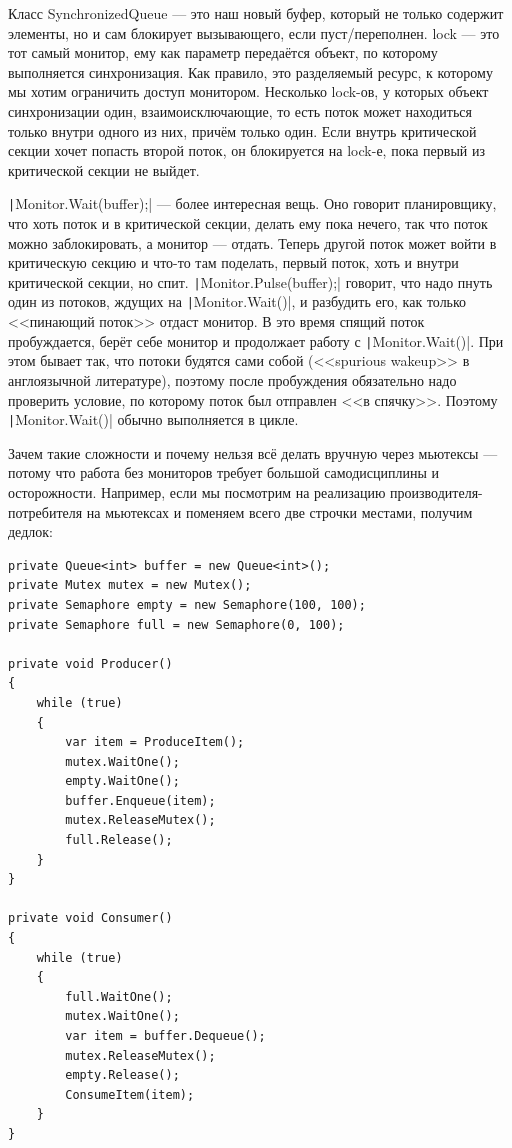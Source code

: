\documentclass[a5paper]{article}
\begin{document}
Класс SynchronizedQueue --- это наш новый буфер, который не только содержит элементы, но и сам блокирует вызывающего, если пуст/переполнен. lock --- это тот самый монитор, ему как параметр передаётся объект, по которому выполняется синхронизация. Как правило, это разделяемый ресурс, к которому мы хотим ограничить доступ монитором. Несколько lock-ов, у которых объект синхронизации один, взаимоисключающие, то есть поток может находиться только внутри одного из них, причём только один. Если внутрь критической секции хочет попасть второй поток, он блокируется на lock-е, пока первый из критической секции не выйдет.

\texttt|Monitor.Wait(buffer);| --- более интересная вещь. Оно говорит планировщику, что хоть поток и в критической секции, делать ему пока нечего, так что поток можно заблокировать, а монитор --- отдать. Теперь другой поток может войти в критическую секцию и что-то там поделать, первый поток, хоть и внутри критической секции, но спит. \texttt|Monitor.Pulse(buffer);| говорит, что надо пнуть один из потоков, ждущих на \texttt|Monitor.Wait()|, и разбудить его, как только <<пинающий поток>> отдаст монитор. В это время спящий поток пробуждается, берёт себе монитор и продолжает работу с \texttt|Monitor.Wait()|. При этом бывает так, что потоки будятся сами собой (<<spurious wakeup>> в англоязычной литературе), поэтому после пробуждения обязательно надо проверить условие, по которому поток был отправлен <<в спячку>>. Поэтому \texttt|Monitor.Wait()| обычно выполняется в цикле.

Зачем такие сложности и почему нельзя всё делать вручную через мьютексы --- потому что работа без мониторов требует большой самодисциплины и осторожности. Например, если мы посмотрим на реализацию производителя-потребителя на мьютексах и поменяем всего две строчки местами, получим дедлок:

\begin{verbatim}
private Queue<int> buffer = new Queue<int>();
private Mutex mutex = new Mutex();
private Semaphore empty = new Semaphore(100, 100);
private Semaphore full = new Semaphore(0, 100);

private void Producer()
{
    while (true)
    {
        var item = ProduceItem();
        mutex.WaitOne();
        empty.WaitOne();
        buffer.Enqueue(item);
        mutex.ReleaseMutex();
        full.Release();
    }
}

private void Consumer()
{
    while (true)
    {
        full.WaitOne();
        mutex.WaitOne();
        var item = buffer.Dequeue();
        mutex.ReleaseMutex();
        empty.Release();
        ConsumeItem(item);
    }
}
\end{verbatim}
\end{document}

